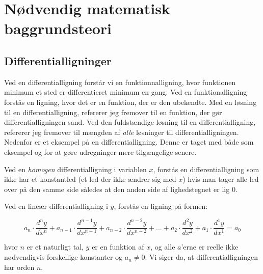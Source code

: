 \section{Nødvendig matematisk baggrundsteori}
\subsection{Differentialligninger}
\newcommand{\LosEks}{$ \{ c\cdot e^{kx}|c\in \mR \} $}%
Ved en differentialligning forstår vi en funktionnalligning, hvor funktionen minimum et sted er differentieret minimum en gang.
Ved en funktionalligning forstås en ligning, hvor det er en funktion, der er den ubekendte. 
Med en løsning til en differentialligning, refererer jeg fremover til en funktion, der gør differentialligningen sand. 
Ved den fuldstændige løsning til en differentialligning, refererer jeg fremover til mængden af \emph{alle} løsninger til differentialligningen. 
Nedenfor er et eksempel på en differentialligning. 
Denne er taget med både som eksempel og for at gøre udregninger mere tilgængelige senere.

\begin{definition}
Ved en \textit{homogen} differentialligning i variablen $x$, forstås en differentialligning som ikke har et konstantled (et led der ikke ændrer sig med $x$) hvis man tager alle led over på den samme side således at den anden side af lighedstegnet er lig $0$.
\end{definition}

\newcommand{\LDiff}[1]{a_{#1} \cdot \frac{d^{#1}y}{d x^{#1}}}
\begin{definition}
Ved en lineær differentialligning i $y$, forstås en ligning på formen:

\begin{equation}
\LDiff{n} + \LDiff{n-1} + \LDiff{n-2}+...+\LDiff{2}+\LDiff{1}=a_0
\end{equation}

hvor $n$ er et naturligt tal, $y$ er en funktion af $x$, og alle $a$'erne er reelle ikke nødvendigvis forskellige konstanter og $a_n \neq 0$.
Vi siger da, at differentialligningen har orden $n$.

\end{definition}



